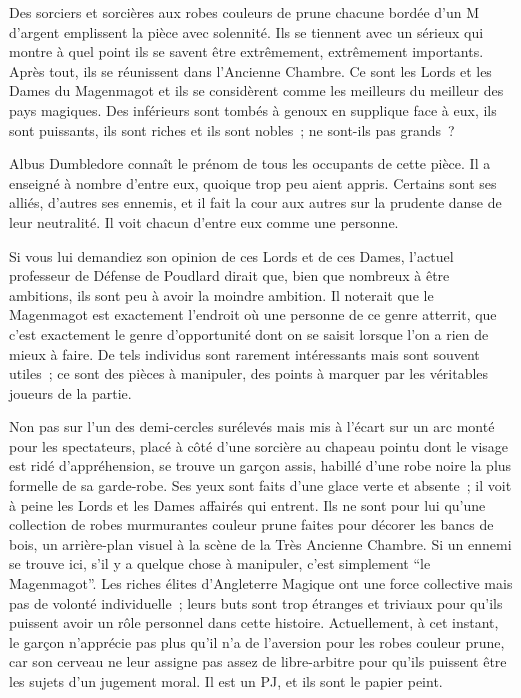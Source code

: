 Des sorciers et sorcières aux robes couleurs de prune chacune bordée d'un M d'argent emplissent la pièce avec solennité.
Ils se tiennent avec un sérieux qui montre à quel point ils se savent être extrêmement, extrêmement importants.
Après tout, ils se réunissent dans l'Ancienne Chambre.
Ce sont les Lords et les Dames du Magenmagot et ils se considèrent comme les meilleurs du meilleur des pays magiques.
Des inférieurs sont tombés à genoux en supplique face à eux, ils sont puissants, ils sont riches et ils sont nobles~; ne sont-ils pas grands~?

Albus Dumbledore connaît le prénom de tous les occupants de cette pièce.
Il a enseigné à nombre d'entre eux, quoique trop peu aient appris.
Certains sont ses alliés, d'autres ses ennemis, et il fait la cour aux autres sur la prudente danse de leur neutralité.
Il voit chacun d'entre eux comme une personne.

Si vous lui demandiez son opinion de ces Lords et de ces Dames, l'actuel professeur de Défense de Poudlard dirait que, bien que nombreux à être ambitions, ils sont peu à avoir la moindre ambition.
Il noterait que le Magenmagot est exactement l'endroit où une personne de ce genre atterrit, que c'est exactement le genre d'opportunité dont on se saisit lorsque l'on a rien de mieux à faire.
De tels individus sont rarement intéressants mais sont souvent utiles~; ce sont des pièces à manipuler, des points à marquer par les véritables joueurs de la partie.

Non pas sur l'un des demi-cercles surélevés mais mis à l'écart sur un arc monté pour les spectateurs, placé à côté d'une sorcière au chapeau pointu dont le visage est ridé d'appréhension, se trouve un garçon assis, habillé d'une robe noire la plus formelle de sa garde-robe.
Ses yeux sont faits d'une glace verte et absente~; il voit à peine les Lords et les Dames affairés qui entrent.
Ils ne sont pour lui qu'une collection de robes murmurantes couleur prune faites pour décorer les bancs de bois, un arrière-plan visuel à la scène de la Très Ancienne Chambre.
Si un ennemi se trouve ici, s'il y a quelque chose à manipuler, c'est simplement “le Magenmagot”.
Les riches élites d'Angleterre Magique ont une force collective mais pas de volonté individuelle~; leurs buts sont trop étranges et triviaux pour qu'ils puissent avoir un rôle personnel dans cette histoire.
Actuellement, à cet instant, le garçon n'apprécie pas plus qu'il n'a de l'aversion pour les robes couleur prune, car son cerveau ne leur assigne pas assez de libre-arbitre pour qu'ils puissent être les sujets d'un jugement moral.
Il est un PJ\footnotemark{}, et ils sont le papier peint.

